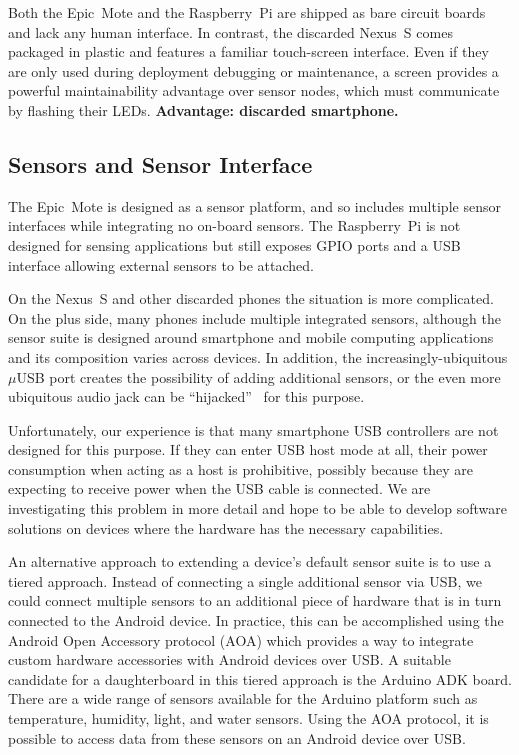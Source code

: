 Both the Epic~Mote and the Raspberry~Pi are shipped as bare circuit boards
and lack any human interface. In contrast, the discarded Nexus~S comes
packaged in plastic and features a familiar touch-screen interface. Even if
they are only used during deployment debugging or maintenance, a screen
provides a powerful maintainability advantage over sensor nodes, which must
communicate by flashing their LEDs. \textbf{Advantage: discarded smartphone.}

\subsection{Sensors and Sensor Interface}

The Epic~Mote is designed as a sensor platform, and so includes multiple
sensor interfaces while integrating no on-board sensors. The Raspberry~Pi is
not designed for sensing applications but still exposes GPIO ports and a USB
interface allowing external sensors to be attached.

On the Nexus~S and other discarded phones the situation is more complicated.
On the plus side, many phones include multiple integrated sensors, although
the sensor suite is designed around smartphone and mobile computing
applications and its composition varies across devices. In addition, the
increasingly-ubiquitous $\mu$USB port creates the possibility of adding
additional sensors, or the even more ubiquitous audio jack can be
``hijacked''~\cite{hijack-dev10} for this purpose.

Unfortunately, our experience is that many smartphone USB controllers are not
designed for this purpose. If they can enter USB host mode at all, their
power consumption when acting as a host is prohibitive, possibly because they
are expecting to receive power when the USB cable is connected. We are
investigating this problem in more detail and hope to be able to develop
software solutions on devices where the hardware has the necessary
capabilities.

An alternative approach to extending a device's default sensor suite is to
use a tiered approach. Instead of connecting a single additional sensor via
USB, we could connect multiple sensors to an additional piece of hardware
that is in turn connected to the Android device. In practice, this can be
accomplished using the Android Open Accessory protocol (AOA) which provides a
way to integrate custom hardware accessories with Android devices over USB. A
suitable candidate for a daughterboard in this tiered approach is the Arduino
ADK board. There are a wide range of sensors available for the Arduino
platform such as temperature, humidity, light, and water sensors. Using the
AOA protocol, it is possible to access data from these sensors on an Android
device over USB.

